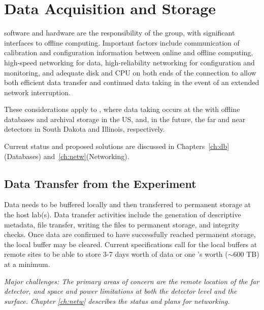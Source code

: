 \documentclass[../main-v1.tex]{subfiles}
\begin{document}





\section{Data Acquisition and Storage}

 software and hardware are the responsibility of the  group, with significant interfaces to offline computing. Important factors include communication of calibration and configuration information between online and offline computing, high-speed networking for data, high-reliability networking for configuration and monitoring, and adequate disk and CPU on both ends of the connection to allow both efficient data transfer and continued data taking in the event of an extended network interruption. 

These considerations apply to , where data taking occurs at the  with offline databases and archival storage in the US,  and, in the future, the far and near detectors in South Dakota and Illinois, respectively. 

Current status and proposed solutions are discussed in Chapters~\ref{ch:db}(Databases) and~\ref{ch:netw}(Networking). 

\subsection{Data Transfer from the Experiment}
Data needs to be buffered locally and then transferred to permanent storage at the host lab(s).  Data transfer activities include the generation of descriptive metadata, file transfer, writing the files to permanent storage, and integrity checks.  Once data are confirmed to have successfully reached permanent storage, the local buffer may be cleared.  Current specifications call for the local buffers at remote sites to be able to store 3-7 days worth of data or one 's worth ($\sim 600$ TB) at a minimum. 

{\it Major challenges: %
The %
primary areas of concern are the remote location of the far detector, and space and power limitations at both the  detector level and the surface. Chapter \ref{ch:netw} describes the status and plans for networking.} %
\end{document}
